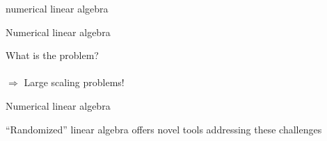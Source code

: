 \documentclass{beamer}
\begin{document}
\begin{frame}{numerical linear algebra}



\end{frame}


\begin{frame}{Numerical linear algebra}

What is the problem?\\
~\\
$\Rightarrow$ Large scaling problems!\\
\end{frame}

\begin{frame}{Numerical linear algebra}

\begin{center}
``Randomized'' linear algebra offers novel tools addressing these challenges
\end{center}

\end{frame}
\end{document}
